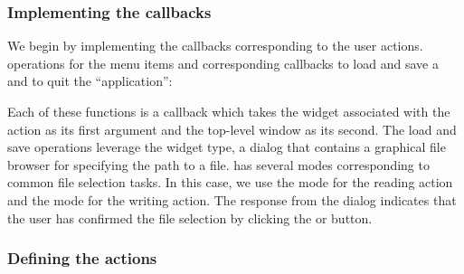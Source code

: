 \documentclass[article,shortnames]{jss}
\begin{document}
\subsubsection{Implementing the callbacks}

We begin by implementing the callbacks corresponding to the user
actions. operations for the menu items and corresponding
callbacks to load and save a  and to quit the
``application'':
Each of these functions is a callback which takes the widget
associated with the action as its first argument and the
top-level window as its second. The load and save operations leverage
the  widget type, a dialog that contains a
graphical file browser for specifying the path to a
file.  has several modes corresponding to
common file selection tasks. In this case, we use the  mode
for the reading action and the  mode for the writing
action. The  response from the dialog indicates that the
user has confirmed the file selection by clicking the  or
 button.

\subsubsection{Defining the actions}\label{sec:spreadsheet-actions}
\end{document}
